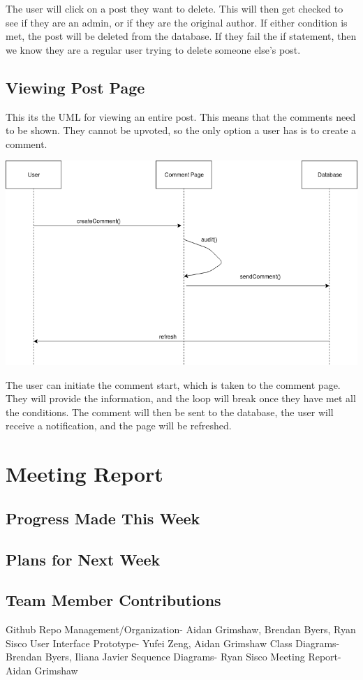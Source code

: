 \documentclass[12pt]{article}
\begin{document}
The user will click on a post they want to delete. This will then get checked to see if they are an admin, or if they are the original author. If either condition is met, the post will be deleted from the database. If they fail the if statement, then we know they are a regular user trying to delete someone else’s post.
\subsection{Viewing Post Page}
This its the UML for viewing an entire post. This means that the comments need to be shown. They cannot be upvoted, so the only option a user has is to create a comment.

\includegraphics[scale=0.50]{img/uml/createComment}

The user can initiate the comment start, which is taken to the comment page. They will provide the information, and the loop will break once they have met all the conditions. The comment will then be sent to the database, the user will receive a notification, and the page will be refreshed.

\section{Meeting Report}

\subsection{Progress Made This Week}

\subsection{Plans for Next Week}
\subsection{Team Member Contributions}
Github Repo Management/Organization- Aidan Grimshaw, Brendan Byers, Ryan Sisco
User Interface Prototype- Yufei Zeng, Aidan Grimshaw
Class Diagrams- Brendan Byers, Iliana Javier
Sequence Diagrams- Ryan Sisco
Meeting Report- Aidan Grimshaw
\end{document}
